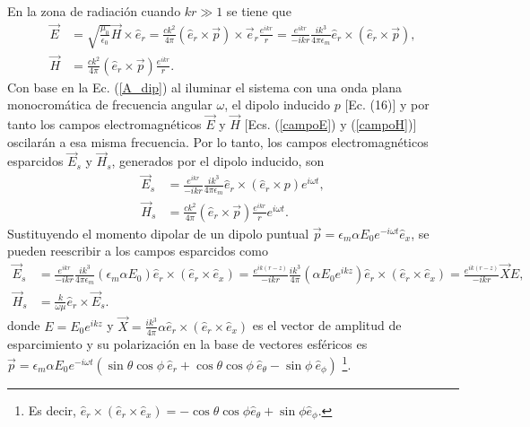 \noindent En la zona de radiación cuando $kr\gg 1$ se tiene que \begin{align}
    \Vec{E}&=\sqrt{\frac{\mu_0}{\epsilon_0}}\Vec{H}\times\hat{e}_r=\frac{ck^2}{4\pi}(\hat{e}_r\times\Vec{p})\times\Vec{e}_r\frac{e^{ikr}}{r}=\frac{e^{ikr}}{-ikr}\frac{ik^3}{4\pi\epsilon_m}\hat{e}_r\times(\hat{e}_r\times\Vec{p}),\label{campoE}\\
    \Vec{H}&=\frac{ck^2}{4\pi}(\hat{e}_r\times\Vec{p})\frac{e^{ikr}}{r}.\label{campoH}  
\end{align}
Con base en la Ec. (\ref{A_dip}) al iluminar el sistema con una onda plana monocromática de frecuencia angular $\omega$, el dipolo inducido $p$ [Ec. (16)] y por tanto los campos electromagnéticos $\Vec{E}$ y $\Vec{H}$ [Ecs. (\ref{campoE}) y (\ref{campoH})] oscilarán a esa misma frecuencia. Por lo tanto, los campos electromagnéticos esparcidos $\Vec{E}_{s}$ y $\Vec{H}_{s}$, generados por el dipolo inducido, son
\begin{align}
    \Vec{E}_{s}&=\frac{e^{ikr}}{-ikr}\frac{ik^3}{4\pi\epsilon_m}\hat{e}_r\times(\hat{e}_r\times p) e^{i\omega t},\\
    \Vec{H}_{s}&=\frac{ck^2}{4\pi}(\hat{e}_r\times\Vec{p})\frac{e^{ikr}}{r}e^{i\omega t}.
\end{align}
 Sustituyendo el momento dipolar de un dipolo puntual $\Vec{p}=\epsilon_m \alpha E_0 e^{-i\omega t}\hat{e}_x$, se pueden reescribir a los campos esparcidos como
 \begin{align}
 	\Vec{E}_{s}&=\frac{e^{ikr}}{-ikr}\frac{ik^3}{4\pi\epsilon_m}\left(\epsilon_m \alpha E_0 \right)\hat{e}_r\times(\hat{e}_r\times \hat{e}_x)=\frac{e^{ik(r-z)}}{-ikr}\frac{ik^3}{4\pi}\left( \alpha E_0 e^{ikz}\right)\hat{e}_r\times(\hat{e}_r\times \hat{e}_x)=\frac{e^{ik(r-z)}}{-ikr}\Vec{X}E,
 	\label{E_scat}\\
 	\Vec{H}_{s}&=\frac{k}{\omega\mu}\hat{e}_r\times\Vec{E}_{s}.
 	\label{H_scat}
 \end{align}
donde $E=E_0 e^{ikz}$ y $\Vec{X}=\frac{ik^3}{4\pi}\alpha \hat{e}_r\times(\hat{e}_r\times \hat{e}_x)$ es
el vector de amplitud de esparcimiento y su polarización en la base de vectores esféricos es $\Vec{p}=\epsilon_m \alpha E_0 e^{-i\omega t}(\sin\theta\cos\phi\: \hat{e}_r+\cos\theta\cos\phi\: \hat{e}_{\theta}-\sin\phi \:\hat{e}_{\phi})$ \footnote{Es decir, $\hat{e}_r\times(\hat{e}_r\times \hat{e}_x)=-\cos\theta\cos\phi \hat{e}_{\theta}+\sin\phi \hat{e}_{\phi}$. }. \\


